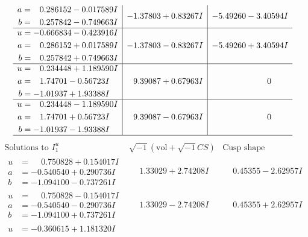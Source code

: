 \documentclass[1p]{elsarticle_modified}
\theoremstyle{definition}
\newcommand{\I}{\sqrt{-1}}
\begin{document}
$$\begin{array}{c|c|c}
\begin{aligned}
a &= \phantom{-}0.286152 - 0.017589 I \\
b &= \phantom{-}0.257842 - 0.749663 I\end{aligned}
 & -1.37803 + 0.83267 I & -5.49260 - 3.40594 I \\ \hline\begin{aligned}
u &= -0.666834 - 0.423916 I \\
a &= \phantom{-}0.286152 + 0.017589 I \\
b &= \phantom{-}0.257842 + 0.749663 I\end{aligned}
 & -1.37803 - 0.83267 I & -5.49260 + 3.40594 I \\ \hline\begin{aligned}
u &= \phantom{-}0.234448 + 1.189590 I \\
a &= \phantom{-}1.74701 - 0.56723 I \\
b &= -1.01937 + 1.93388 I\end{aligned}
 & \phantom{-}9.39087 + 0.67963 I & \phantom{-0.000000 } 0 \\ \hline\begin{aligned}
u &= \phantom{-}0.234448 - 1.189590 I \\
a &= \phantom{-}1.74701 + 0.56723 I \\
b &= -1.01937 - 1.93388 I\end{aligned}
 & \phantom{-}9.39087 - 0.67963 I & \phantom{-0.000000 } 0\\
 \hline 
 \end{array}$$\newpage$$\begin{array}{c|c|c}  
\text{Solutions to }I^u_{1}& \I (\text{vol} + \sqrt{-1}CS) & \text{Cusp shape}\\
 \hline 
\begin{aligned}
u &= \phantom{-}0.750828 + 0.154017 I \\
a &= -0.540540 + 0.290736 I \\
b &= -1.094100 - 0.737261 I\end{aligned}
 & \phantom{-}1.33029 + 2.74208 I & \phantom{-}0.45355 - 2.62957 I \\ \hline\begin{aligned}
u &= \phantom{-}0.750828 - 0.154017 I \\
a &= -0.540540 - 0.290736 I \\
b &= -1.094100 + 0.737261 I\end{aligned}
 & \phantom{-}1.33029 - 2.74208 I & \phantom{-}0.45355 + 2.62957 I \\ \hline\begin{aligned}
u &= -0.360615 + 1.181320 I \\

\end{aligned}
\end{array}$$
\end{document}
